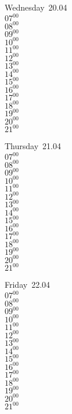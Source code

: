\documentclass[11pt,a4paper]{book}\usepackage[]{graphicx}\usepackage[]{color}
\begin{document}
\begin{weekdaybox}
  Wednesday~20.04\\
  { 
  \vfill
  $07^{00}$\\
$08^{00}$\\
$09^{00}$\\
$10^{00}$\\
$11^{00}$\\
$12^{00}$\\
$13^{00}$\\
$14^{00}$\\
$15^{00}$\\
$16^{00}$\\
$17^{00}$\\
$18^{00}$\\
$19^{00}$\\
$20^{00}$\\
$21^{00}$\\
  }
\end{weekdaybox}
\clearpage
\begin{headerbox}
\end{headerbox}
\begin{weekdaybox}
  Thursday~21.04\\
  { 
  \vfill
  $07^{00}$\\
$08^{00}$\\
$09^{00}$\\
$10^{00}$\\
$11^{00}$\\
$12^{00}$\\
$13^{00}$\\
$14^{00}$\\
$15^{00}$\\
$16^{00}$\\
$17^{00}$\\
$18^{00}$\\
$19^{00}$\\
$20^{00}$\\
$21^{00}$\\
  }
\end{weekdaybox} 
\begin{weekdaybox}
  Friday~22.04\\
  { 
  \vfill
  $07^{00}$\\
$08^{00}$\\
$09^{00}$\\
$10^{00}$\\
$11^{00}$\\
$12^{00}$\\
$13^{00}$\\
$14^{00}$\\
$15^{00}$\\
$16^{00}$\\
$17^{00}$\\
$18^{00}$\\
$19^{00}$\\
$20^{00}$\\
$21^{00}$\\
  }
\end{weekdaybox}
\end{document}

